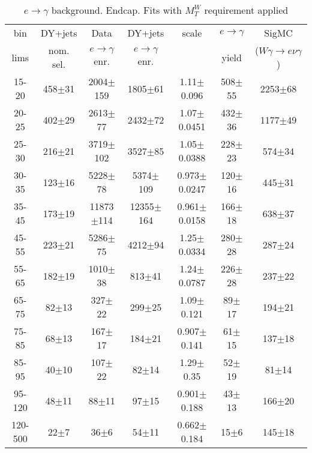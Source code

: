 \begin{table}[h]
  \scriptsize
  \begin{center}
  \caption{$e\rightarrow\gamma$ background. Endcap. Fits with $M_T^W$ requirement applied }  
  \begin{tabular}{|c|c|c|c|c|c|c|}
 bin  & DY+jets    & Data                      & DY+jets & scale & $e\rightarrow\gamma$ & SigMC\\ 
 lims & nom. sel. & $e\rightarrow\gamma$ enr. & $e\rightarrow\gamma$ enr. & & yield & ($W\gamma\rightarrow e\nu\gamma$)\\ \hline
15-20 & 458$\pm$31 & 2004$\pm$159 & 1805$\pm$61 & 1.11$\pm$0.096& 508$\pm$55& 2253$\pm$68 \\ \hline
20-25 & 402$\pm$29 & 2613$\pm$77 & 2432$\pm$72 & 1.07$\pm$0.0451& 432$\pm$36& 1177$\pm$49 \\ \hline
25-30 & 216$\pm$21 & 3719$\pm$102 & 3527$\pm$85 & 1.05$\pm$0.0388& 228$\pm$23& 574$\pm$34 \\ \hline
30-35 & 123$\pm$16 & 5228$\pm$78 & 5374$\pm$109 & 0.973$\pm$0.0247& 120$\pm$16& 445$\pm$31 \\ \hline
35-45 & 173$\pm$19 & 11873$\pm$114 & 12355$\pm$164 & 0.961$\pm$0.0158& 166$\pm$18& 638$\pm$37 \\ \hline
45-55 & 223$\pm$21 & 5286$\pm$75 & 4212$\pm$94 & 1.25$\pm$0.0334& 280$\pm$28& 287$\pm$24 \\ \hline
55-65 & 182$\pm$19 & 1010$\pm$38 & 813$\pm$41 & 1.24$\pm$0.0787& 226$\pm$28& 237$\pm$22 \\ \hline
65-75 & 82$\pm$13 & 327$\pm$22 & 299$\pm$25 & 1.09$\pm$0.121& 89$\pm$17& 194$\pm$21 \\ \hline
75-85 & 68$\pm$13 & 167$\pm$17 & 184$\pm$21 & 0.907$\pm$0.141& 61$\pm$15& 137$\pm$18 \\ \hline
85-95 & 40$\pm$10 & 107$\pm$22 & 82$\pm$14 & 1.29$\pm$0.35& 52$\pm$19& 81$\pm$14 \\ \hline
95-120 & 48$\pm$11 & 88$\pm$11 & 97$\pm$15 & 0.901$\pm$0.188& 43$\pm$13& 166$\pm$20 \\ \hline
120-500 & 22$\pm$7 & 36$\pm$6 & 54$\pm$11 & 0.662$\pm$0.184& 15$\pm$6& 145$\pm$18 \\ \hline
  \end{tabular}
  \label{tab:EtoGAMMA_1}
  \end{center}
\end{table}


